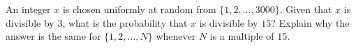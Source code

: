An integer $x$ is chosen uniformly at random from $\{1,2,\dots,3000\}$. Given that $x$ is divisible by $3$, what is the probability that $x$ is divisible by $15$? Explain why the answer is the same for $\{1,2,\dots,N\}$ whenever $N$ is a multiple of $15$.
